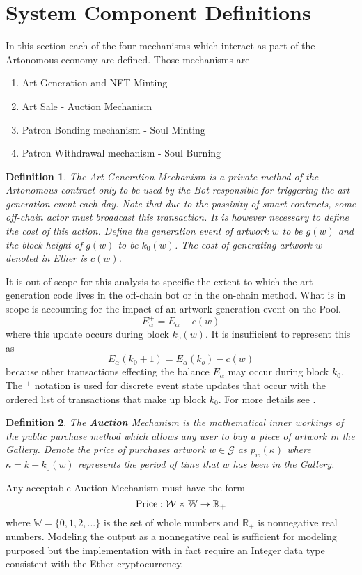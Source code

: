 \documentclass[11pt]{amsart}
\newtheorem{definition}{Definition}
\begin{document}
\section{System Component Definitions}

In this section each of the four mechanisms which interact as part of the Artonomous economy are defined. Those mechanisms are
\begin{enumerate}
\item Art Generation and NFT Minting
\item Art Sale - Auction Mechanism
\item Patron Bonding mechanism - Soul Minting
\item Patron Withdrawal mechanism - Soul Burning 
\end{enumerate}

\begin{definition}
The Art Generation Mechanism is a private method of the Artonomous contract only to be used by the Bot responsible for triggering the art generation event each day. Note that due to the passivity of smart contracts, some off-chain actor must broadcast this transaction.  It is however necessary to define the cost of this action. Define the generation event of artwork $w$ to be $g(w)$ and the block height of $g(w)$ to be $k_0(w)$. The cost of generating artwork $w$ denoted in Ether is $c(w)$.
\end{definition}
It is out of scope for this analysis to specific the extent to which the art generation code lives in the off-chain bot or in the on-chain method. What is in scope is accounting for the impact of an artwork generation event on the Pool.
\begin{equation}
E_\alpha^+ = E_\alpha - c(w) \label{costs}
\end{equation}
where this update occurs during block $k_0(w)$. It is insufficient to represent this as 
\[ E_\alpha(k_0+1) = E_\alpha (k_o) - c(w) \]
because other transactions effecting the balance $E_\alpha$ may occur during block $k_0$. The $^+$ notation is used for discrete event state updates that occur with the ordered list of transactions that make up block $k_0$. For more details see \cite{MZ_ICCS2018}.

\begin{definition}
The \textbf{Auction} Mechanism is the mathematical inner workings of the public purchase method which allows any user to buy a piece of artwork in the Gallery. Denote the price of purchases artwork $w\in \mathcal{G}$ as $p_w(\kappa)$ where $\kappa = k- k_0(w)$ represents the period of time that $w$ has been in the Gallery.  
\end{definition}
Any acceptable Auction Mechanism must have the form
\begin{equation}
\hbox{Price}:  \mathcal{W} \times \mathbb{W} \rightarrow \mathbb{R}_+
\end{equation}
where $\mathbb{W} = \{0,1,2,...\}$ is the set of whole numbers and $\mathbb{R}_+$ is nonnegative real numbers. Modeling the output as a nonnegative real is sufficient for modeling purposed but the implementation with in fact require an Integer data type consistent with the Ether cryptocurrency.
\end{document}
